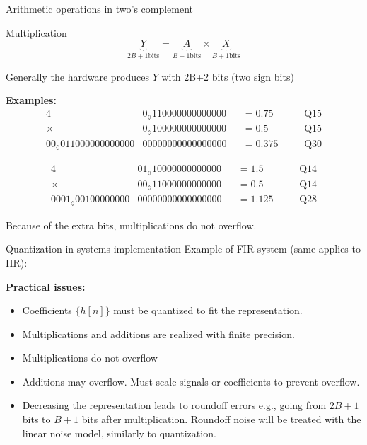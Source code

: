\documentclass[10pt, handout]{beamer}
\begin{document}
%
\begin{frame}{Arithmetic operations in two's complement}
	\begin{block}{Multiplication}
		\begin{equation*}
		\underbrace{Y}_{2B+1 \text{bits}} = \underbrace{A}_{B+1 \text{bits}}\times \underbrace{X}_{B+1 \text{bits}}
		\end{equation*}
		
		Generally the hardware produces $Y$ with 2B+2 bits (two sign bits)
		
		\textbf{Examples:}
		\begin{alignat*}{4}
		&0_\lozenge110000000000000 &&= 0.75 &&&~\text{Q15} \\
		\times & 0_\lozenge100000000000000 &&= 0.5 &&&~\text{Q15} \\
		\hline
		00_\lozenge 011000000000000&00000000000000000 &&= 0.375 &&&~\text{Q30}
		\end{alignat*}
		
		
		\begin{alignat*}{4}
		&01_\lozenge10000000000000 &&= 1.5 &&&~\text{Q14} \\
		\times & 00_\lozenge11000000000000 &&= 0.5 &&&~\text{Q14} \\
		\hline
		0001_\lozenge 00100000000&00000000000000000 &&= 1.125 &&&~\text{Q28}
		\end{alignat*}
		
		Because of the extra bits, multiplications do not overflow.
		
	\end{block}
\end{frame}

\begin{frame}{Quantization in systems implementation}
Example of FIR system (same applies to IIR):
\begin{center}
	\resizebox{\textwidth}{!}{}
\end{center}

\textbf{Practical issues:}
\begin{itemize}
	\item Coefficients $\{h[n]\}$ must be quantized to fit the representation.
	\item Multiplications and additions are realized with finite precision.
	\item Multiplications do not overflow
	\item Additions may overflow. Must scale signals or coefficients to prevent overflow.
	\item Decreasing the representation leads to roundoff errors e.g., going from $2B+1$ bits to $B+1$ bits after multiplication. Roundoff noise will be treated with the linear noise model, similarly to quantization.
\end{itemize}
\end{frame}
\end{document}
